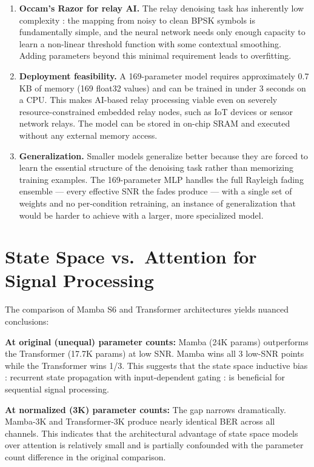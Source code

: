 \begin{enumerate}
\def\labelenumi{\arabic{enumi}.}
\item
  \textbf{Occam's Razor for relay AI.} The relay denoising task has inherently low complexity : the mapping from noisy to clean BPSK symbols is fundamentally simple, and the neural network needs only enough capacity to learn a non-linear threshold function with some contextual smoothing. Adding parameters beyond this minimal requirement leads to overfitting.
\item
  \textbf{Deployment feasibility.} A 169-parameter model requires approximately 0.7 KB of memory (169 float32 values) and can be trained in under 3 seconds on a CPU. This makes AI-based relay processing viable even on severely resource-constrained embedded relay nodes, such as IoT devices or sensor network relays. The model can be stored in on-chip SRAM and executed without any external memory access.
\item
  \textbf{Generalization.} Smaller models generalize better because they are forced to learn the essential structure of the denoising task rather than memorizing training examples. The 169-parameter MLP handles the full Rayleigh fading ensemble --- every effective SNR the fades produce --- with a single set of weights and no per-condition retraining, an instance of generalization that would be harder to achieve with a larger, more specialized model.
\end{enumerate}

\section{State Space vs.~Attention for Signal Processing}\label{sec:state-space-vs.-attention-for-signal-processing}

The comparison of Mamba S6 and Transformer architectures yields nuanced conclusions:

\textbf{At original (unequal) parameter counts:} Mamba (24K params) outperforms the Transformer (17.7K params) at low SNR. Mamba wins all 3 low-SNR points while the Transformer wins 1/3. This suggests that the state space inductive bias : recurrent state propagation with input-dependent gating : is beneficial for sequential signal processing.

\textbf{At normalized (3K) parameter counts:} The gap narrows dramatically. Mamba-3K and Transformer-3K produce nearly identical BER across all channels. This indicates that the architectural advantage of state space models over attention is relatively small and is partially confounded with the parameter count difference in the original comparison.

